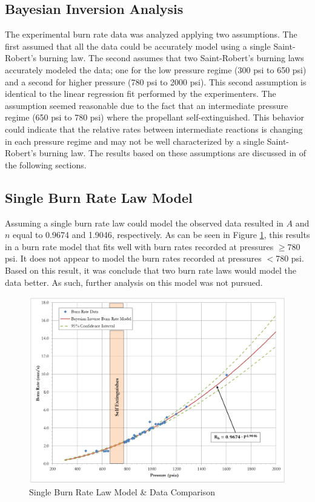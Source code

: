 \documentclass{article}
\begin{document}
\subsection{Bayesian Inversion Analysis} \label{resultsBayes}

The experimental burn rate data was analyzed applying two assumptions. The first assumed
that all the data could be accurately model using a single Saint-Robert's burning law. The second 
assumes that two Saint-Robert's burning laws accurately modeled the data; one for the low pressure 
regime (300 psi to 650 psi) and a second for higher pressure (780 psi to 2000 psi). This 
second assumption is identical to the linear regression fit performed by the experimenters. The assumption
seemed reasonable due to the fact that an intermediate 
pressure regime (650 psi to 780 psi) where the propellant self-extinguished. This behavior 
could indicate that the relative rates between intermediate reactions is changing in each 
pressure regime and may not be well characterized by a single Saint-Robert's burning law. 
The results based on these assumptions are discussed in of the following sections.

\subsection{Single Burn Rate Law Model} \label{singleRate}

Assuming a single burn rate law could model the observed data resulted in $A$ and $n$ equal 
to 0.9674 and 1.9046, respectively. As can be seen in Figure \ref{SingleBRfig}, this 
results in a burn rate model that fits well with burn rates recorded at pressures $\geq$780 psi.
It does not appear to model the burn rates recorded at pressures $<$780 psi. 
Based on this result, it was conclude that two burn rate laws would model the data better. 
As such, further analysis on this model was not pursued.

\begin{figure}[htb]
\centering
\includegraphics[width=\textwidth]{Single_Burn_Rate_Results.png}
\caption{Single Burn Rate Law Model \& Data Comparison}
\label{SingleBRfig}
\end{figure}
\end{document}
